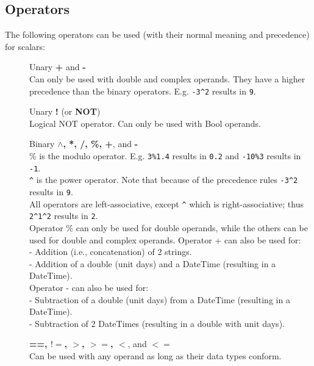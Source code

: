 \subsection{\label{TAQL:OPERATORS}Operators}
The following operators can be used (with their normal meaning and
precedence) for scalars:
\begin{description}
  \item[] Unary \textbf{+} and \textbf{-}
       \\Can only be used with double and complex operands.
       They have a higher precedence than the binary operators.
       E.g. \texttt{-3}\verb+^+\texttt{2} results in \texttt{9}.
  \item[] Unary \textbf{!} (or \textbf{NOT})
       \\Logical NOT operator.
       Can only be used with Bool operands.
  \item[] Binary \textbf{$\wedge$, *, /, \%, +}, and \textbf{-}
       \\\% is the modulo operator.
       E.g. \texttt{3\%1.4} results in \texttt{0.2} and
       \texttt{-10\%3} results in \texttt{-1}.
       \\\verb+^+ is the power operator.
       Note that because of the precedence rules
       \texttt{-3}\verb+^+\texttt{2} results in \texttt{9}.
       \\All operators are left-associative, except \verb+^+ which is
       right-associative; thus \texttt{2}\verb+^+\texttt{1}\verb+^+\texttt{2} results in \texttt{2}.
       \\Operator \% can only be used for double operands, while the others
       can be used for double and complex operands.
       Operator + can also be used for:
       \\- Addition (i.e., concatenation) of 2 strings.
       \\- Addition of a double (unit days) and a DateTime
       (resulting in a DateTime).
       \\Operator - can also be used for:
       \\- Subtraction of a double (unit days) from a DateTime
       (resulting in a DateTime).
       \\- Subtraction of 2 DateTimes (resulting in a double with unit days).
  \item[] \textbf{==, $!=$, $>$, $>=$, $<$}, and \textbf{$<=$}
       \\Can be used with any operand as long as their data types conform.

\end{description}
